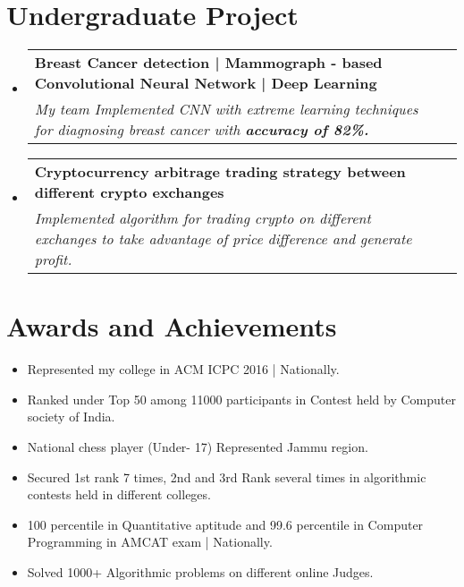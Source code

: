 \documentclass[letterpaper,11pt]{article}
\makeatletter
\newcommand{\resumeItem}[2]{
  \item\small{
    \textbf{#1}{ #2 \vspace{-2pt}}
  }
}
\newcommand{\EducationFormat}[4]{
  \vspace{-1pt}\item
    \begin{tabular*}{0.97\textwidth}[t]{l@{\extracolsep{\fill}}r}
      \textbf{\small#1} & #2 \\
      \textit{\small#3} & \textit{\small #4} \\
    \end{tabular*}\vspace{-5pt}
}
\newcommand{\resumeSubItem}[2]{\resumeItem{#1}{#2}\vspace{-4pt}}
\newcommand{\resumeSubHeadingListStart}{\begin{itemize}[leftmargin=*]}
\newcommand{\resumeSubHeadingListEnd}{\end{itemize}}
\makeatother
\begin{document}
\section{Undergraduate Project}
\resumeSubHeadingListStart
  \EducationFormat
  {Breast Cancer detection \big| Mammograph - based
  Convolutional Neural Network \big| Deep Learning}{}
  {My team Implemented CNN with extreme learning techniques for diagnosing breast cancer with  \textbf{accuracy of 82\%.}}
  {}
  \vspace{-4pt}
  \EducationFormat
  {Cryptocurrency arbitrage trading strategy between different crypto exchanges}{}
  {Implemented algorithm for trading crypto on different exchanges to take advantage
  of price difference and generate profit.}
  {}

\resumeSubHeadingListEnd
\section{Awards and Achievements}
\resumeSubHeadingListStart
\resumeSubItem{}{Represented my college in ACM ICPC 2016 \big| Nationally.}{}
\resumeSubItem{}{Ranked under Top 50 among 11000 participants in Contest held by
Computer society of India.}
\resumeSubItem{}{National chess player (Under- 17) Represented Jammu region.}
\resumeSubItem{}{Secured 1st rank 7 times, 2nd and 3rd Rank several times in algorithmic
contests held in different colleges.}
\resumeSubItem{}{100 percentile in Quantitative aptitude and 99.6 percentile in
Computer Programming in AMCAT exam \big| Nationally.}
\resumeSubItem{}{Solved 1000+ Algorithmic problems on different online Judges.}
\resumeSubHeadingListEnd
\end{document}

